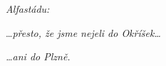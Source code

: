 \vspace*{23mm}
\begin{center}
\begin{large}
    \textit{Alfastádu:}
    \vspace*{5mm}
\end{large}

\begin{Large}
\end{Large}
\end{center}

\begin{large}
\vspace{1mm}
\hspace*{\fill}\dots\textit{přesto, že jsme nejeli do Okříšek\dots}
\vspace{5mm}

\hspace*{\fill}\textit{\dots ani do Plzně.}
\end{large}
\newpage
